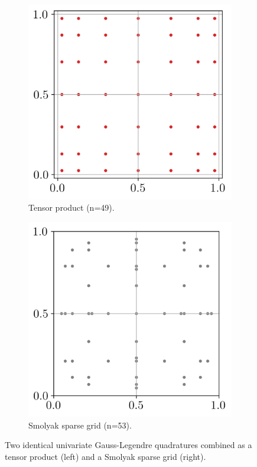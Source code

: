 \begin{figure}[h!]
    \centering
    \begin{subfigure}[b]{0.32\textwidth}
        \centering
        \includegraphics[width=\textwidth]{../numerical_experiments/chapter1/figures/tensorized_gaussian_quadrature.png}
        \caption{Tensor product (n=49).}
    \end{subfigure}
    \quad
    \begin{subfigure}[b]{0.32\textwidth}
        \centering
        \includegraphics[width=\textwidth]{../numerical_experiments/chapter1/figures/smolyak_gaussian_quadrature.png}
        \caption{Smolyak sparse grid (n=53).}
    \end{subfigure}
    \caption{Two identical univariate Gauss-Legendre quadratures combined as a tensor product (left) and a Smolyak sparse grid (right).}
    \label{fig:bivariate_quads}
\end{figure}


